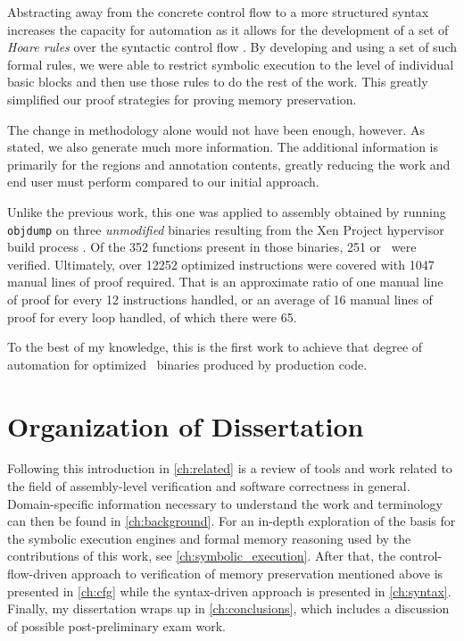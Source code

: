 Abstracting away from the concrete control flow to a more structured syntax
increases the capacity for automation
as it allows for the development of a set of \emph{Hoare rules}
over the syntactic control flow \autocite{hoare1969axiomatic}.
By developing and using a set of such formal rules, we were able to restrict symbolic execution
to the level of individual basic blocks and then use those rules to do the rest of the work.
This greatly simplified our proof strategies for proving memory preservation.

The change in methodology alone would not have been enough, however.
As stated, we also generate much more information.
The additional information is primarily for the regions and annotation contents,
greatly reducing the work and end user must perform compared to our initial approach.

Unlike the previous work, this one was applied to assembly obtained
by running \texttt{objdump} on three \emph{unmodified} binaries resulting from the
Xen Project hypervisor build process \autocite{chisnall2008definitive}.
Of the \num{352} functions present in those binaries,
\num{251} or \xenpercentage\ were verified.
Ultimately, over \num{12252} optimized instructions were covered
with \num{1047} manual lines of proof required.
That is an approximate ratio of one manual line of proof
for every \num{12} instructions handled,
or an average of \num{16} manual lines of proof for every loop handled,
of which there were \num{65}.

To the best of my knowledge, this is the first work to achieve that degree of automation
for optimized \arch\ binaries produced by production code.

\section{Organization of Dissertation}
Following this introduction in \cref{ch:related} is a review of tools and work
related to the field of assembly-level verification and software correctness in general.
Domain-specific information necessary to understand the work
and terminology can then be found in \cref{ch:background}.
For an in-depth exploration of the basis for the symbolic execution engines
and formal memory reasoning used by the contributions of this work,
see \cref{ch:symbolic_execution}.
After that, the control-flow-driven approach to verification of memory preservation
mentioned above is presented in \cref{ch:cfg}
while the syntax-driven approach is presented in \cref{ch:syntax}.
Finally, my dissertation wraps up in \cref{ch:conclusions},
which includes a discussion of possible post-preliminary exam work.
